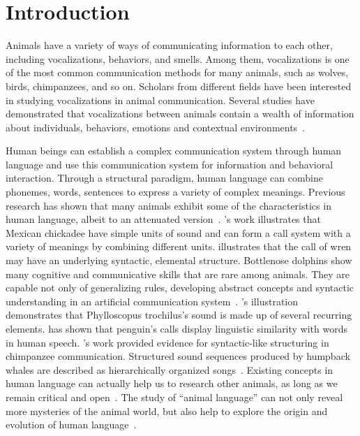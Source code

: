 \section{Introduction}
\label{sec:intro}

Animals have a variety of ways of communicating information to each other, including vocalizations, behaviors, and smells. 
Among them, vocalizations is one of the most common communication methods for many animals, such as wolves, birds, chimpanzees, and so on. 
Scholars from different fields have been interested in studying vocalizations in animal communication. 
Several studies have demonstrated that vocalizations between animals contain a wealth of information about individuals, behaviors, emotions and contextual environments~\cite{abzaliev2024towards,hantke2018my}.

Human beings can establish a complex communication system through human language and 
use this communication system for information and behavioral interaction. 
Through a structural paradigm, human language can combine phonemes, 
words, sentences to express a variety of complex meanings. 
Previous research has shown that many animals exhibit some of the characteristics in 
human language, albeit to an attenuated version~\citep{kershenbaum2014animal,cartmill2023overcoming}. 
\citet{ficken1994chick}'s work illustrates that Mexican chickadee have simple units of sound and can form a call system with a variety of meanings by combining different units. 
\citet{holland2000coding} illustrates that the call of wren may have an underlying syntactic, elemental structure. 
Bottlenose dolphins show many cognitive and communicative skills that are rare among animals. They are capable not only of generalizing rules, developing abstract concepts and syntactic understanding in an artificial communication system~\citep{janik2000whistle}. 
\citet{gil2000song}'s illustration demonstrates that Phylloscopus trochilus's sound is made up of several recurring elements. 
\citet{favaro2020penguins} has shown that penguin's calls display linguistic similarity with words in human speech.
\citet{leroux2023call}'s work provided evidence for syntactic-like structuring in chimpanzee communication. 
Structured sound sequences produced by humpback whales are described as hierarchically organized songs~\citep{mercado2012understanding}. 
Existing concepts in human language can actually help us to research other animals, as long as we remain critical and open~\citep{meijer2019animal}. 
The study of ``animal language'' can not only reveal more mysteries of the animal world, but also help to explore the origin and evolution of human language~\citep{berthet2023animal}.

